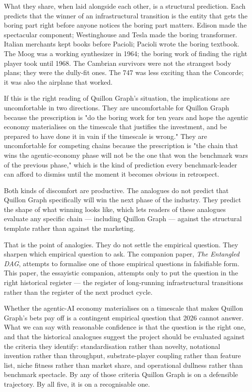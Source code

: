\documentclass[11pt,a4paper]{article}
\begin{document}
What they share, when laid alongside each other, is a structural
prediction. Each predicts that the winner of an infrastructural
transition is the entity that gets the boring part right before anyone
notices the boring part matters. Edison made the spectacular component;
Westinghouse and Tesla made the boring transformer. Italian merchants
kept books before Pacioli; Pacioli wrote the boring textbook. The Moog
was a working synthesizer in 1964; the boring work of finding the right
player took until 1968. The Cambrian survivors were not the strangest
body plans; they were the dully-fit ones. The 747 was less exciting
than the Concorde; it was also the airplane that worked.

If this is the right reading of Quillon Graph's situation, the
implications are uncomfortable in two directions. They are uncomfortable
for Quillon Graph because the prescription is "do the boring work for
ten years and hope the agentic economy materialises on the timescale
that justifies the investment, and be prepared to have done it in vain
if the timescale is wrong." They are uncomfortable for competing chains
because the prescription is "the chain that wins the agentic-economy
phase will not be the one that won the benchmark wars of the previous
phase," which is the kind of prediction every benchmark-leader can
afford to dismiss until the moment it becomes obvious in retrospect.

Both kinds of discomfort are productive. The analogues do not predict
that Quillon Graph specifically will win the next phase of the industry.
They predict the shape of what winning looks like, which lets readers of
these analogues evaluate any specific chain --- including Quillon Graph
--- against the structural template rather than against the marketing.

That is the point of analogies. They do not settle the empirical
question. They sharpen which empirical question to ask. The companion
paper, \emph{The Entangled DAG}, attempts to formalise one of those
empirical questions in falsifiable form. This paper, the essayistic
companion, attempts only to put the question in the right historical
register --- the register of long-running infrastructural transitions
rather than the register of the next product cycle.

Whether the agentic-AI economy materialises on a timescale that makes
Quillon Graph's bets pay off is a contingent empirical question that
2026 cannot answer. What we can say with reasonable confidence is that
the question is the right one, and that the historical analogues
suggest the project should be evaluated against the criteria they
identify: standardisation rather than novelty, notational invention
rather than throughput, substrate-player coupling rather than feature
list, niche fitness rather than market share, and operational dullness
rather than benchmark spectacle. By any of those criteria Quillon Graph
is on a defensible trajectory. By all five, it is on a recognisable one.
\end{document}
